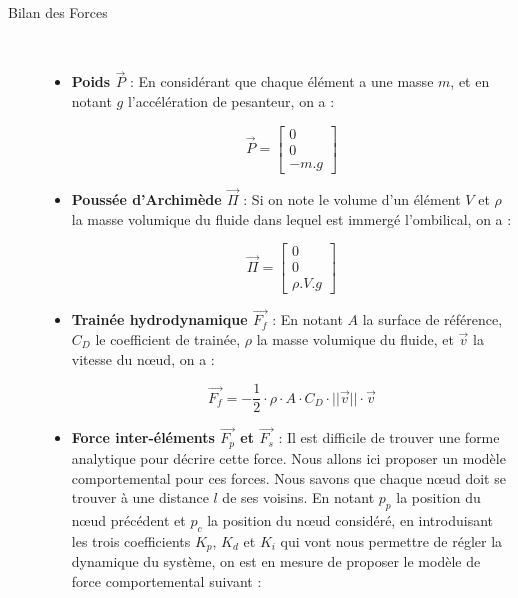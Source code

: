 				\begin{description}
					\item [Bilan des Forces] \
					\begin{itemize}
						\item[\textbullet] \textbf{Poids $\overrightarrow{P}$} : En considérant que chaque élément a une masse $m$, et en notant $g$ l'accélération de pesanteur, on a : 
						
						\begin{equation}
							\overrightarrow{P} = \begin{bmatrix}0\\ 0\\ -m.g\end{bmatrix}
							\label{eq:poids}
						\end{equation}
				
						\item[\textbullet] \textbf{Poussée d'Archimède $\overrightarrow{\Pi}$} : Si on note le volume d'un élément $V$ et $\rho$ la masse volumique du fluide dans lequel est immergé l'ombilical, on a : 
						
						\begin{equation}
							\overrightarrow{\Pi} = \begin{bmatrix}0\\ 0\\ \rho.V.g\end{bmatrix}
							\label{eq:archimede}
						\end{equation}
				
						\item[\textbullet] \textbf{Trainée hydrodynamique $\overrightarrow{F_f}$} : En notant $A$ la surface de référence, $C_D$ le coefficient de trainée, $\rho$ la masse volumique du fluide, et $\overrightarrow{v}$ la vitesse du n\oe ud, on a : 
					
						\begin{equation}
							\overrightarrow{F_f} = - \frac{1}{2} \cdot \rho \cdot A \cdot C_D \cdot ||\overrightarrow{v}|| \cdot \overrightarrow{v}
							\label{eq:drag}
						\end{equation}
						
						\item[\textbullet] \textbf{Force inter-éléments $\overrightarrow{F_p}$ et $\overrightarrow{F_s}$} : Il est difficile de trouver une forme analytique pour décrire cette force. Nous allons ici proposer un modèle comportemental pour ces forces. Nous savons que chaque n\oe ud doit se trouver à une distance $l$ de ses voisins. En notant $p_{p}$ la position du n\oe ud précédent et $p_{c}$ la position du n\oe ud considéré, en introduisant les trois coefficients $K_p$, $K_d$ et $K_i$ qui vont nous permettre de régler la dynamique du système, on est en mesure de proposer le modèle de force comportemental suivant :
						

\end{itemize}
\end{description}

